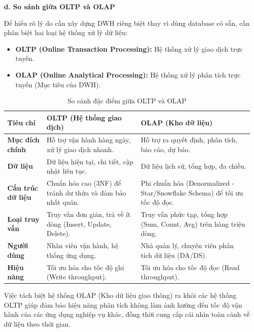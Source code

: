 \textbf{d. So sánh giữa OLTP và OLAP}

Để hiểu rõ lý do cần xây dựng DWH riêng biệt thay vì dùng database có sẵn, cần phân biệt hai loại hệ thống xử lý dữ liệu:
\begin{itemize}
    \item \textbf{OLTP (Online Transaction Processing):} Hệ thống xử lý giao dịch trực tuyến.
    \item \textbf{OLAP (Online Analytical Processing):} Hệ thống xử lý phân tích trực tuyến (Mục tiêu của DWH).
\end{itemize}

\begin{table}[h!]
\centering
\caption{So sánh đặc điểm giữa OLTP và OLAP}
\begin{tabular}{|p{3.5cm}|p{5.5cm}|p{5.5cm}|}
\hline
\textbf{Tiêu chí} & 
\textbf{OLTP (Hệ thống giao dịch)} & 
\textbf{OLAP (Kho dữ liệu)} \\ 
\hline

\textbf{Mục đích chính} &
Hỗ trợ vận hành hàng ngày, xử lý giao dịch nhanh. &
Hỗ trợ ra quyết định, phân tích, báo cáo, dự báo. \\ 
\hline

\textbf{Dữ liệu} &
Dữ liệu hiện tại, chi tiết, cập nhật liên tục. &
Dữ liệu lịch sử, tổng hợp, đa chiều. \\ 
\hline

\textbf{Cấu trúc dữ liệu} &
Chuẩn hóa cao (3NF) để tránh dư thừa và đảm bảo nhất quán. &
Phi chuẩn hóa (Denormalized - Star/Snowflake Schema) để tối ưu tốc độ đọc. \\ 
\hline

\textbf{Loại truy vấn} &
Truy vấn đơn giản, trả về ít dòng (Insert, Update, Delete). &
Truy vấn phức tạp, tổng hợp (Sum, Count, Avg) trên hàng triệu dòng. \\ 
\hline

\textbf{Người dùng} &
Nhân viên vận hành, hệ thống ứng dụng. &
Nhà quản lý, chuyên viên phân tích dữ liệu (DA/DS). \\ 
\hline

\textbf{Hiệu năng} &
Tối ưu hóa cho tốc độ ghi (Write throughput). &
Tối ưu hóa cho tốc độ đọc (Read throughput). \\ 
\hline

\end{tabular}
\end{table}

Việc tách biệt hệ thống OLAP (Kho dữ liệu giao thông) ra khỏi các hệ thống OLTP giúp đảm bảo hiệu năng phân tích không làm ảnh hưởng đến tốc độ vận hành của các ứng dụng nghiệp vụ khác, đồng thời cung cấp cái nhìn toàn cảnh về dữ liệu theo thời gian.


